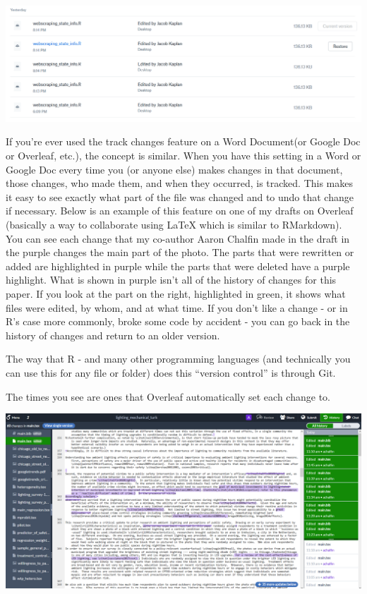 \documentclass[
  12pt,
  openany]{book}
\begin{document}
\includegraphics{images/dropbox.png}

If you're ever used the track changes feature on a Word Document(or Google Doc or Overleaf, etc.), the concept is similar. When you have this setting in a Word or Google Doc every time you (or anyone else) makes changes in that document, those changes, who made them, and when they occurred, is tracked. This makes it easy to see exactly what part of the file was changed and to undo that change if necessary. Below is an example of this feature on one of my drafts on Overleaf (basically a way to collaborate using LaTeX which is similar to RMarkdown). You can see each change that my co-author Aaron Chalfin made in the draft in the purple changes the main part of the photo. The parts that were rewritten or added are highlighted in purple while the parts that were deleted have a purple highlight. What is shown in purple isn't all of the history of changes for this paper. If you look at the part on the right, highlighted in green, it shows what files were edited, by whom, and at what time. If you don't like a change - or in R's case more commonly, broke some code by accident - you can go back in the history of changes and return to an older version.

The way that R - and many other programming languages (and technically you can use this for any file or folder) does this ``version control'' is through Git.

The times you see are ones that Overleaf automatically set each change to.

\includegraphics{images/overleaf.png}
\end{document}
